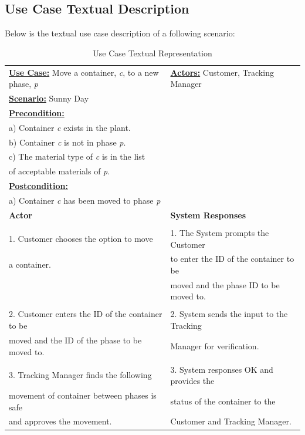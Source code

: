 \documentclass[fontsize=12pt,paper=letter,twoside]{scrartcl}
\begin{document}
\subsection{Use Case Textual Description}

Below is the textual use case description of a following scenario:


\begin{table}[h]
\begin{center}
\begin{tabular}{|l|l|}
\hline
\textbf{\underline {Use Case:} } Move a container, \emph{c}, to a new phase, \emph{p} & \textbf {\underline {Actors:} } Customer, Tracking Manager
\\ \textbf{\underline {Scenario:} } Sunny Day &
\\ \textbf{\underline {Precondition:} } &
\\ a) Container \emph{c} exists in the plant. &
\\ b) Container \emph{c} is not in phase \emph{p}. &
\\ c) The material type of \emph{c} is in the list &
\\ of acceptable materials of \emph{p}. &
\\ \textbf{\underline {Postcondition:} } &
\\ a) Container \emph{c} has been moved to phase \emph{p} &

\\ \hline
\textbf{Actor} &  \textbf{System Responses}
\\ \hline &

\\ 1. Customer chooses the option to move & 1. The System prompts the Customer
\\ a container. & to enter the ID of the container to be 
\\ & moved and the phase ID to be moved to.
\\ &
\\ 2. Customer enters the ID of the container to be & 2. System sends the input to the Tracking
\\ moved and the ID of the phase to be moved to. & Manager for verification.
\\ &
\\ 3. Tracking Manager finds the following & 3. System responses OK and provides the
\\ movement of container between phases is safe & status of the container to the
\\ and approves the movement. & Customer and Tracking Manager.


\\ \hline
\end{tabular}
\end{center}
\caption {Use Case Textual Representation}
\label{tbl:uctd}
\end{table}
\end{document}
